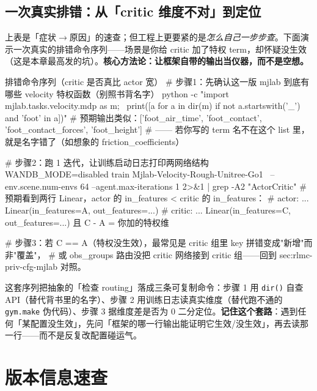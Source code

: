 \subsection*{一次真实排错：从「critic 维度不对」到定位}
\label{sec:rlmc-priv-realdebug}

上表是「症状$\to$原因」的速查；但工程上更要紧的是\emph{怎么自己一步步查}。下面演示一次真实的排错命令序列——场景是你给 critic 加了特权 term，却怀疑没生效（这是本章最高发的坑）。\textbf{核心方法论：让框架自带的输出当仪器，而不是空想。}

\begin{codebox}[bash]{排错命令序列（critic 是否真比 actor 宽）}
# 步骤1：先确认这一版 mjlab 到底有哪些 velocity 特权函数（别照书背名字）
python -c "import mjlab.tasks.velocity.mdp as m; \
print([a for a in dir(m) if not a.startswith('_') and 'foot' in a])"
# 预期输出类似：['foot_air_time', 'foot_contact', 'foot_contact_forces', 'foot_height']
# —— 若你写的 term 名不在这个 list 里，就是名字错了（如想象的 friction_coefficients）

# 步骤2：跑 1 迭代，让训练启动日志打印两网络结构
WANDB_MODE=disabled train Mjlab-Velocity-Rough-Unitree-Go1 \
    --env.scene.num-envs 64 --agent.max-iterations 1 2>&1 | grep -A2 "ActorCritic"
# 预期看到两行 Linear，actor 的 in_features < critic 的 in_features：
#   actor:  ... Linear(in_features=A, out_features=...)
#   critic: ... Linear(in_features=C, out_features=...)   且 C - A = 你加的特权维

# 步骤3：若 C == A（特权没生效），最常见是 critic 组里 key 拼错变成"新增"而非"覆盖"，
# 或 obs_groups 路由没把 critic 网络接到 critic 组——回到 sec:rlmc-priv-cfg-mjlab 对照。
\end{codebox}

这套序列把抽象的「检查 routing」落成三条可复制命令：步骤 1 用 \verb|dir()| 自查 API（替代背书里的名字）、步骤 2 用训练日志读真实维度（替代跑不通的 \verb|gym.make| 伪代码）、步骤 3 据维度差是否为 0 二分定位。\textbf{记住这个套路}：遇到任何「某配置没生效」，先问「框架的哪一行输出能证明它生效/没生效」，再去读那一行——而不是反复改配置碰运气。

\section*{版本信息速查}
\addcontentsline{toc}{section}{版本信息速查}
\label{sec:rlmc-priv-version}

